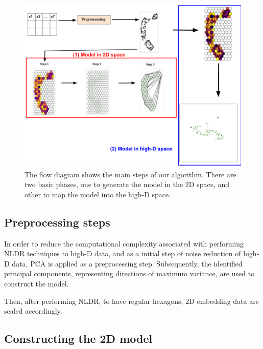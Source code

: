 \documentclass[
  12pt]{article}
\begin{document}
\begin{figure}

{\centering \includegraphics[width=1\textwidth,height=1\textheight]{figures/workflow.png}

}

\caption{\label{fig-meth}The flow diagram shows the main steps of our
algorithm. There are two basic phases, one to generate the model in the
2D space, and other to map the model into the high-D space.}

\end{figure}

\hypertarget{preprocessing-steps}{%
\subsection{Preprocessing steps}\label{preprocessing-steps}}

In order to reduce the computational complexity associated with
performing NLDR techniques to high-D data, and as a initial step of
noise reduction of high-D data, PCA \citep[\citet{article68},
\citet{article69}]{article67} is applied as a preprocessing step.
Subsequently, the identified principal components, representing
directions of maximum variance, are used to construct the model.

Then, after performing NLDR, to have regular hexagons, 2D embedding data
are scaled accordingly.

\hypertarget{sec-construct2d}{%
\subsection{Constructing the 2D model}\label{sec-construct2d}}
\end{document}
